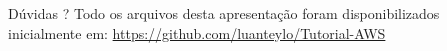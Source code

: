 \documentclass[xcolor=table]{beamer}
\begin{document}
{
\begin{frame}[c]{}

    \begin{center}

 
            Dúvidas ?
            \vskip 0.5cm
            Todo os arquivos desta apresentação foram disponibilizados inicialmente em: \url{https://github.com/luanteylo/Tutorial-AWS}
             
      
         
    \end{center}
     
       
\end{frame}
}
\end{document}
